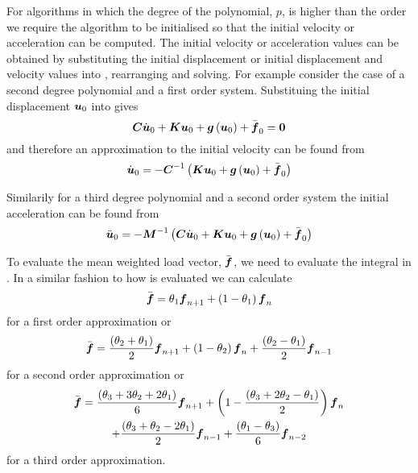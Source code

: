 For algorithms in which the degree of the polynomial, $p$, is higher than the
order we require the algorithm to be initialised so that the initial velocity
or acceleration can be computed. The initial velocity or acceleration values
can be obtained by substituting the initial displacement or initial
displacement and velocity values into ,
rearranging and solving. For example consider the case of a second degree
polynomial and a first order system. Substituing the initial displacement
$ \boldsymbol{u} _{0}$ into  gives
\begin{equation}
  \matr{C}\dot{\vectr{u}}_{0}+\matr{K}\vectr{u}_{0}+\fnof{\vectr{g}}{\vectr{u}_{0}}+\bar{\vectr{f}}_{0}=\vectr{0}
\end{equation}
and therefore an approximation to the initial velocity can be found from
\begin{equation}
  \dot{\vectr{u}}_{0}=-\inverse{\matr{C}}\pbrac{\matr{K}\vectr{u}_{0}+\fnof{\vectr{g}}{\vectr{u}_{0}}+\bar{\vectr{f}}_{0}}
\end{equation}

Similarily for a third degree polynomial and a second order system the initial
acceleration can be found from
\begin{equation}
  \ddot{\vectr{u}}_{0}=-\inverse{\matr{M}}\pbrac{\matr{C}\dot{\vectr{u}}_{0}+\matr{K}\vectr{u}_{0}+
    \fnof{\vectr{g}}{\vectr{u}_{0}}+\bar{\vectr{f}}_{0}}
\end{equation}

To evaluate the mean weighted load vector, $\bar{ \boldsymbol{f} }$, we need to
evaluate the integral in . In a similar
fashion to how  is evaluated we can
calculate
\begin{equation}
  \bar{\vectr{f}}=\theta_{1}\vectr{f}_{n+1}+\pbrac{1-\theta_{1}}\vectr{f}_{n}
  \label{eqn:firstordermeanweightedloadvector}
\end{equation}
for a first order approximation or
\begin{equation}
  \bar{\vectr{f}}=\dfrac{\pbrac{\theta_{2}+\theta_{1}}}{2}\vectr{f}_{n+1}+\pbrac{1-\theta_{2}}\vectr{f}_{n}
  +\dfrac{\pbrac{\theta_{2}-\theta_{1}}}{2}\vectr{f}_{n-1}
  \label{eqn:secondordermeanweightedloadvector}
\end{equation}
for a second order approximation or
\begin{multline}
  \bar{\vectr{f}}=\dfrac{\pbrac{\theta_{3}+3\theta_{2}+2\theta_{1}}}{6}\vectr{f}_{n+1}
  +\pbrac{1-\dfrac{\pbrac{\theta_{3}+2\theta_{2}-\theta_{1}}}{2}}\vectr{f}_{n} \\
  +\dfrac{\pbrac{\theta_{3}+\theta_{2}-2\theta_{1}}}{2}\vectr{f}_{n-1}
  +\dfrac{\pbrac{\theta_{1}-\theta_{3}}}{6}\vectr{f}_{n-2}
  \label{eqn:thirdordermeanweightedloadvector}
\end{multline}
for a third order approximation.

